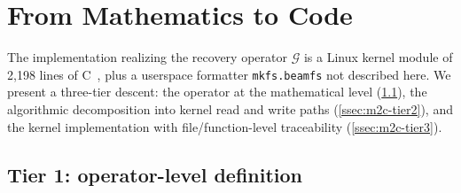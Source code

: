 \section{From Mathematics to Code}\label{sec:m2c}

The implementation realizing the recovery operator
\(\mathcal{G}\) is a Linux kernel module of 2{,}198 lines of
C~\cite{beamfs-impl}, plus a userspace formatter
\texttt{mkfs.beamfs} not described here. We present a three-tier
descent: the operator at the mathematical level
(\cref{ssec:m2c-tier1}), the algorithmic decomposition into kernel
read and write paths (\cref{ssec:m2c-tier2}), and the kernel
implementation with file/function-level traceability
(\cref{ssec:m2c-tier3}).

\subsection{Tier 1: operator-level definition}\label{ssec:m2c-tier1}

